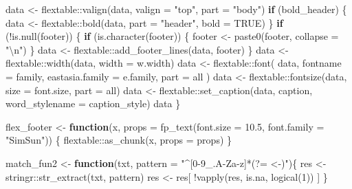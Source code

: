 \documentclass[
]{article}
\newenvironment{Shaded}{\begin{snugshade}}{\end{snugshade}}
\newcommand{\AttributeTok}[1]{\textcolor[rgb]{0.77,0.63,0.00}{#1}}
\newcommand{\ConstantTok}[1]{\textcolor[rgb]{0.00,0.00,0.00}{#1}}
\newcommand{\ControlFlowTok}[1]{\textcolor[rgb]{0.13,0.29,0.53}{\textbf{#1}}}
\newcommand{\DecValTok}[1]{\textcolor[rgb]{0.00,0.00,0.81}{#1}}
\newcommand{\FloatTok}[1]{\textcolor[rgb]{0.00,0.00,0.81}{#1}}
\newcommand{\FunctionTok}[1]{\textcolor[rgb]{0.00,0.00,0.00}{#1}}
\newcommand{\NormalTok}[1]{#1}
\newcommand{\OtherTok}[1]{\textcolor[rgb]{0.56,0.35,0.01}{#1}}
\newcommand{\SpecialCharTok}[1]{\textcolor[rgb]{0.00,0.00,0.00}{#1}}
\newcommand{\StringTok}[1]{\textcolor[rgb]{0.31,0.60,0.02}{#1}}
\begin{document}
\begin{Shaded}
\begin{Highlighting}[]
\NormalTok{  data }\OtherTok{\textless{}{-}}\NormalTok{ flextable}\SpecialCharTok{::}\FunctionTok{valign}\NormalTok{(data, }\AttributeTok{valign =} \StringTok{"top"}\NormalTok{, }\AttributeTok{part =} \StringTok{"body"}\NormalTok{)}
  \ControlFlowTok{if}\NormalTok{ (bold\_header) \{}
\NormalTok{    data }\OtherTok{\textless{}{-}}\NormalTok{ flextable}\SpecialCharTok{::}\FunctionTok{bold}\NormalTok{(data, }\AttributeTok{part =} \StringTok{"header"}\NormalTok{, }\AttributeTok{bold =} \ConstantTok{TRUE}\NormalTok{)}
\NormalTok{  \}}
  \ControlFlowTok{if}\NormalTok{ (}\SpecialCharTok{!}\FunctionTok{is.null}\NormalTok{(footer)) \{}
    \ControlFlowTok{if}\NormalTok{ (}\FunctionTok{is.character}\NormalTok{(footer)) \{}
\NormalTok{      footer }\OtherTok{\textless{}{-}} \FunctionTok{paste0}\NormalTok{(footer, }\AttributeTok{collapse =} \StringTok{"}\SpecialCharTok{\textbackslash{}n}\StringTok{"}\NormalTok{)}
\NormalTok{    \}}
\NormalTok{    data }\OtherTok{\textless{}{-}}\NormalTok{ flextable}\SpecialCharTok{::}\FunctionTok{add\_footer\_lines}\NormalTok{(data, footer)}
\NormalTok{  \}}
\NormalTok{  data }\OtherTok{\textless{}{-}}\NormalTok{ flextable}\SpecialCharTok{::}\FunctionTok{width}\NormalTok{(data, }\AttributeTok{width =}\NormalTok{ w.width)}
\NormalTok{  data }\OtherTok{\textless{}{-}}\NormalTok{ flextable}\SpecialCharTok{::}\FunctionTok{font}\NormalTok{(}
\NormalTok{    data, }\AttributeTok{fontname =}\NormalTok{ family, }\AttributeTok{eastasia.family =}\NormalTok{ e.family, }\AttributeTok{part =} \StringTok{\textquotesingle{}all\textquotesingle{}}
\NormalTok{  )}
\NormalTok{  data }\OtherTok{\textless{}{-}}\NormalTok{ flextable}\SpecialCharTok{::}\FunctionTok{fontsize}\NormalTok{(data, }\AttributeTok{size =}\NormalTok{ font.size, }\AttributeTok{part =} \StringTok{\textquotesingle{}all\textquotesingle{}}\NormalTok{)}
\NormalTok{  data }\OtherTok{\textless{}{-}}\NormalTok{ flextable}\SpecialCharTok{::}\FunctionTok{set\_caption}\NormalTok{(data, caption, }\AttributeTok{word\_stylename =}\NormalTok{ caption\_style)}
\NormalTok{  data}
\NormalTok{\}}

\NormalTok{flex\_footer }\OtherTok{\textless{}{-}} \ControlFlowTok{function}\NormalTok{(x, }\AttributeTok{props =} \FunctionTok{fp\_text}\NormalTok{(}\AttributeTok{font.size =} \FloatTok{10.5}\NormalTok{, }\AttributeTok{font.family =} \StringTok{"SimSun"}\NormalTok{)) \{}
\NormalTok{  flextable}\SpecialCharTok{::}\FunctionTok{as\_chunk}\NormalTok{(x, }\AttributeTok{props =}\NormalTok{ props)}
\NormalTok{\}}

\NormalTok{match\_fun2 }\OtherTok{\textless{}{-}} \ControlFlowTok{function}\NormalTok{(txt, }\AttributeTok{pattern =} \StringTok{"\^{}[0{-}9\_.A{-}Za{-}z]*(?= \textless{}{-})"}\NormalTok{)\{}
\NormalTok{  res }\OtherTok{\textless{}{-}}\NormalTok{ stringr}\SpecialCharTok{::}\FunctionTok{str\_extract}\NormalTok{(txt, pattern)}
\NormalTok{  res }\OtherTok{\textless{}{-}}\NormalTok{ res[ }\SpecialCharTok{!}\FunctionTok{vapply}\NormalTok{(res, is.na, }\FunctionTok{logical}\NormalTok{(}\DecValTok{1}\NormalTok{)) ]}
\NormalTok{\}}


\end{Highlighting}
\end{Shaded}
\end{document}
